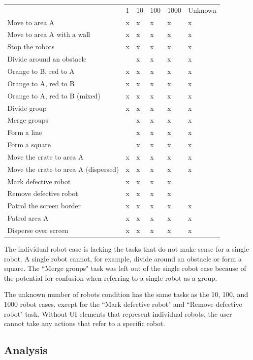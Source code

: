 \begin{tabular}{l|l|l|l|l|l}
& 1 & 10 & 100 & 1000 & Unknown \\
Move to area A & x & x & x & x & x\\
Move to area A with a wall & x & x & x & x & x \\
Stop the robots & x & x & x & x & x\\
Divide around an obstacle & & x & x & x & x \\
Orange to B, red to A & x & x & x & x & x \\
Orange to A, red to B & x & x & x & x & x \\
Orange to A, red to B (mixed) & x & x & x & x & x \\
Divide group & x & x & x & x & x \\
Merge groups & & x & x & x & x \\
Form a line & & x & x & x & x \\
Form a square & & x & x & x & x \\
Move the crate to area A & x & x & x & x & x \\
Move the crate to area A (dispersed) & x & x & x & x & x\\
Mark defective robot & x & x & x & x & \\
Remove defective robot & x & x & x & x &  \\
Patrol the screen border & x & x & x & x & x \\
Patrol area A & x & x & x & x & x \\
Disperse over screen & x & x & x & x & x \\
\end{tabular}

The individual robot case is lacking the tasks that do not make sense for a single robot. A single robot cannot, for example, divide around an obstacle or form a square. 
The ``Merge groups" task was left out of the single robot case because of the potential for confusion when referring to a single robot as a group. 

The unknown number of robots condition has the same tasks as the 10, 100, and 1000 robot cases, except for the ``Mark defective robot" and ``Remove defective robot" task. 
Without UI elements that represent individual robots, the user cannot take any actions that refer to a specific robot. 

\subsection{Analysis} \label{section:Analysis}

